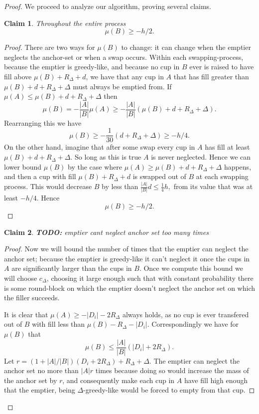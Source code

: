 \documentclass[twocolumn]{article}[10pt]
\newcommand{\todo}[1]{{\color{red}\textbf{TODO:} #1}}
\newtheorem{clm}{Claim}
\begin{document}
\begin{proof}
We proceed to analyze our algorithm, proving several claims.
\begin{clm}
  \label{clm:muBdoesntSinkTooLow}
  Throughout the entire process
  $$\mu(B) \ge -h/2.$$
\end{clm}
\begin{proof}
  There are two ways for $\mu(B)$ to change: it can
  change when the emptier neglects the anchor-set or when a swap
  occurs. Within each swapping-process, because the emptier is
  greedy-like, and because no cup in $B$ ever is raised to have
  fill above $\mu(B) + R_\Delta + d$, we have that any cup in $A$
  that has fill greater than $\mu(B) + d + R_\Delta + \Delta$
  must always be emptied from. If $\mu(A) \le \mu(B) + d +
  R_\Delta + \Delta$ then
  $$\mu(B) = -\frac{|A|}{|B|}\mu(A) \ge -\frac{|A|}{|B|}\left(\mu(B) + d + R_\Delta + \Delta\right).$$
  Rearranging this we have
  $$\mu(B) \ge -\frac{1}{30}(d + R_\Delta + \Delta) \ge -h/4.$$
  On the other hand, imagine that after some swap every cup in
  $A$ has fill at least $\mu(B) + d + R_\Delta + \Delta$.
  So long as this is true $A$ is never neglected. Hence we can
  lower bound $\mu(B)$ by the case where $\mu(A) \ge \mu(B) + d +
  R_\Delta + \Delta$ happens, and then a cup with fill $\mu(B) +
  R_\Delta + d$ is swapped out of $B$ at each swapping process.
  This would decrease $B$ by less than $\frac{|A|}{|B|} d \le
  \frac{1}{4} h,$ from its value that was at least $-h/4$. Hence
  $$\mu(B) \ge -h/2.$$
\end{proof}

\begin{clm}
  \label{clm:emptierCantNeglectAnchorTooMuch}
  \todo{emptier cant neglect anchor set too many times}
\end{clm}
\begin{proof}
  Now we will bound the number of times that the emptier can
  neglect the anchor set; because the emptier is greedy-like it
  can't neglect it once the cups in $A$ are significantly larger
  than the cups in $B$. Once we compute this bound we will choose
  $c_\Delta$, choosing it large enough such that with constant
  probability there is some round-block on which the emptier
  doesn't neglect the anchor set on which the filler succeeds.

  It is clear that $\mu(A) \ge -|D_i| -2R_\Delta$ always holds,
  as no cup is ever transfered out of $B$ with fill less than
  $\mu(B) - R_\Delta -|D_i|$. Correspondingly we have for
  $\mu(B)$ that $$\mu(B) \le \frac{|A|}{|B|}(|D_i| + 2R_\Delta).$$
  Let $r = (1+|A|/|B|)(D_i + 2R_\Delta) + R_\Delta + \Delta.$
  The emptier can neglect the anchor set no more than $|A|r$
  times because doing so would increase the mass of the anchor
  set by $r$, and consequently make each cup in $A$ have fill
  high enough that the emptier, being $\Delta$-greedy-like would
  be forced to empty from that cup.
  

\end{proof}
\end{proof}
\end{document}
